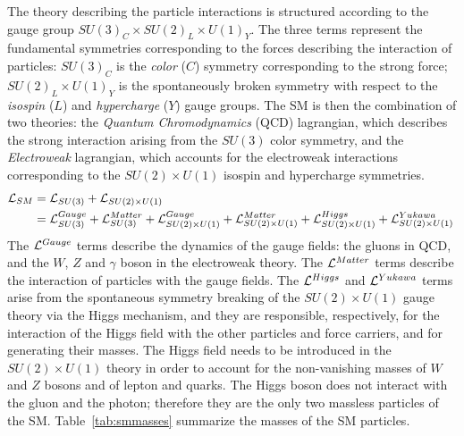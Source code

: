The theory describing the particle interactions is structured
according to the gauge group $SU(3)_C\times{}SU(2)_L\times{}U(1)_Y$. The three
terms represent the fundamental symmetries corresponding to the forces describing the
interaction of particles: $SU(3)_C$ is the {\it color} ($C$) symmetry corresponding
to the strong force; $SU(2)_L\times{}U(1)_Y$ is the spontaneously
broken symmetry with respect to the {\it isospin} ($L$)
and {\it hypercharge} ($Y$) gauge groups.
The SM is then the combination of two theories: the {\it Quantum
  Chromodynamics} (QCD) lagrangian, which describes the strong
interaction arising from the $SU(3)$ color symmetry, and the {\it
  Electroweak} lagrangian, which accounts for the electroweak
interactions corresponding to the $SU(2)\times{}U(1)$ isospin and
hypercharge symmetries.
\begin{equation}
\begin{split}
\mathcal{L}{}_{SM}  & = \mathcal{L}{}_{SU(3)} + \mathcal{L}{}_{SU(2)\times{}U(1)} \\
& = \mathcal{L}{}_{SU(3)}^{Gauge} + \mathcal{L}{}_{SU(3)}^{Matter} 
+ \mathcal{L}{}_{SU(2)\times{}U(1)}^{Gauge} + \mathcal{L}{}_{SU(2)\times{}U(1)}^{Matter}
+ \mathcal{L}{}_{SU(2)\times{}U(1)}^{Higgs} +
\mathcal{L}{}_{SU(2)\times{}U(1)}^{Yukawa} \\
\end{split}
\phantom{.}
\end{equation}
The $\mathcal{L}{}^{Gauge}$ terms describe the dynamics of the gauge fields:
the gluons in QCD, and the $W$, $Z$ and $\gamma$ boson in the
electroweak theory.
The $\mathcal{L}{}^{Matter}$ terms describe the
interaction of particles with the gauge fields. The $\mathcal{L}{}^{Higgs}$
and $\mathcal{L}{}^{Yukawa}$ terms arise from the spontaneous symmetry
breaking of the $SU(2)\times{}U(1)$ gauge theory via the Higgs
mechanism, and they are responsible, respectively, for the interaction
of the Higgs field with the other particles and force carriers, and
for generating their masses.
The Higgs field
needs to be introduced in
the $SU(2)\times{}U(1)$ theory in order to account for the
non-vanishing masses of $W$ and $Z$ bosons and of lepton and quarks.
The Higgs boson does not interact with the gluon and the photon;
therefore they are the only two massless particles of the
SM. Table~\ref{tab:smmasses} summarize the masses of the SM particles.

